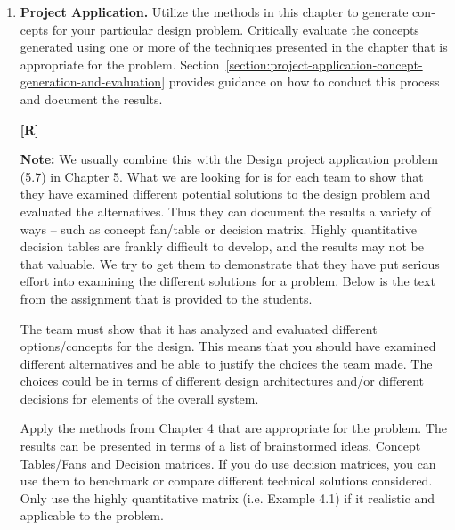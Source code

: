 \begin{enumerate}
\item
  \textbf{Project Application.} Utilize the methods in this chapter to
  generate con­cepts for your particular design problem. Critically
  evaluate the concepts generated using one or more of the techniques
  presented in the chapter that is appropriate for the problem. 
  Section~\ref{section:project-application-concept-generation-and-evaluation}
  pro­vides guidance on how to conduct this process and document the
  results.

  \begin{onlysolution}
    \textbf{[R]}
    \itshape
    
    \textbf{Note:} We usually combine this with the Design project application problem (5.7) 
    in Chapter 5. What we are looking for is for each team to show that they have examined 
    different potential solutions to the design problem and evaluated the alternatives. 
    Thus they can document the results a variety of ways – such as concept fan/table or 
    decision matrix. Highly quantitative decision tables are frankly difficult to develop, 
    and the results may not be that valuable. We try to get them to demonstrate that they 
    have put serious effort into examining the different solutions for a problem. Below is 
    the text from the assignment that is provided to the students.

    The team must show that it has analyzed and evaluated different options/concepts for the 
    design. This means that you should have examined different alternatives and be able to 
    justify the choices the team made. The choices could be in terms of different design 
    architectures and/or different decisions for elements of the overall system.
    
    Apply the methods from Chapter 4 that are appropriate for the problem. The results can be 
    presented in terms of a list of brainstormed ideas, Concept Tables/Fans and Decision 
    matrices. If you do use decision matrices, you can use them to benchmark or compare different 
    technical solutions considered. Only use the highly quantitative matrix (i.e. Example 4.1) if 
    it realistic and applicable to the problem.
  \end{onlysolution}

\end{enumerate}

